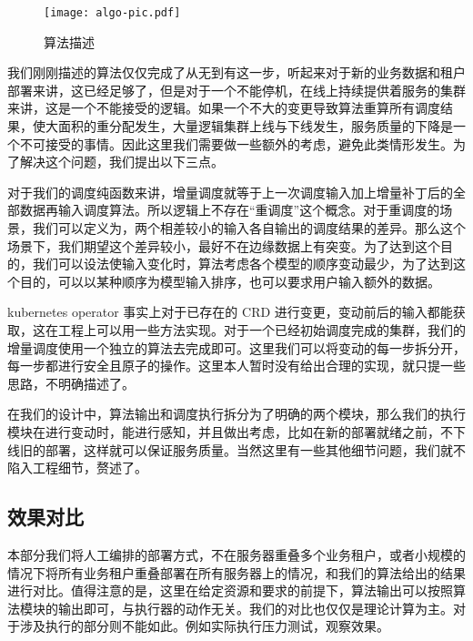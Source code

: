 \begin{figure}

\centering

\texttt{[image: algo-pic.pdf]}

\caption{算法描述}\label{fig:algo}

\end{figure}


我们刚刚描述的算法仅仅完成了从无到有这一步，听起来对于新的业务数据和租户部署来讲，这已经足够了，但是对于一个不能停机，在线上持续提供着服务的集群来讲，这是一个不能接受的逻辑。如果一个不大的变更导致算法重算所有调度结果，使大面积的重分配发生，大量逻辑集群上线与下线发生，服务质量的下降是一个不可接受的事情。因此这里我们需要做一些额外的考虑，避免此类情形发生。为了解决这个问题，我们提出以下三点。


对于我们的调度纯函数来讲，增量调度就等于上一次调度输入加上增量补丁后的全部数据再输入调度算法。所以逻辑上不存在“重调度”这个概念。对于重调度的场景，我们可以定义为，两个相差较小的输入各自输出的调度结果的差异。那么这个场景下，我们期望这个差异较小，最好不在边缘数据上有突变。为了达到这个目的，我们可以设法使输入变化时，算法考虑各个模型的顺序变动最少，为了达到这个目的，可以以某种顺序为模型输入排序，也可以要求用户输入额外的数据。


kubernetes operator 事实上对于已存在的 CRD 进行变更，变动前后的输入都能获取，这在工程上可以用一些方法实现。对于一个已经初始调度完成的集群，我们的增量调度使用一个独立的算法去完成即可。这里我们可以将变动的每一步拆分开，每一步都进行安全且原子的操作。这里本人暂时没有给出合理的实现，就只提一些思路，不明确描述了。



在我们的设计中，算法输出和调度执行拆分为了明确的两个模块，那么我们的执行模块在进行变动时，能进行感知，并且做出考虑，比如在新的部署就绪之前，不下线旧的部署，这样就可以保证服务质量。当然这里有一些其他细节问题，我们就不陷入工程细节，赘述了。


\subsection{效果对比}

本部分我们将人工编排的部署方式，不在服务器重叠多个业务租户，或者小规模的情况下将所有业务租户重叠部署在所有服务器上的情况，和我们的算法给出的结果进行对比。值得注意的是，这里在给定资源和要求的前提下，算法输出可以按照算法模块的输出即可，与执行器的动作无关。我们的对比也仅仅是理论计算为主。对于涉及执行的部分则不能如此。例如实际执行压力测试，观察效果。

